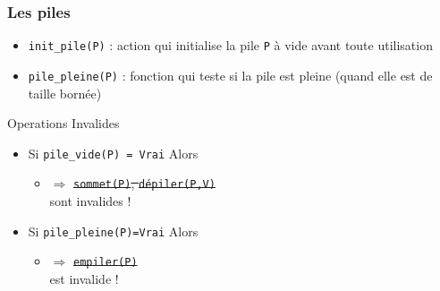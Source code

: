 \documentclass[table,handout,tikz,12pt,svgnames]{beamer}
\begin{document}

\begin{frame}[fragile=singleslide]
	\frametitle{Les piles}
	\begin{block}{}
		\begin{itemize}
			\item \texttt{init\_pile(P)} : action qui initialise la pile \texttt{P} à vide avant toute utilisation
			\item \texttt{pile\_pleine(P)} : fonction qui teste si la pile est pleine (quand elle est de taille bornée)
		\end{itemize}
	\end{block}
	\begin{block}{Operations Invalides}
		\begin{itemize}
			\item Si \hspace{0.2em} \texttt{pile\_vide(P) = Vrai} \hspace{0.2em} Alors
			\begin{itemize}
				\item[] \texttt{$\Rightarrow$} \sout{\texttt{sommet(P)}, \texttt{dépiler(P,V)}} \\sont invalides !
			\end{itemize}
			\item Si \hspace{0.2em} \texttt{pile\_pleine(P)=Vrai} \hspace{0.2em} Alors
			\begin{itemize}
				\item[] \texttt{$\Rightarrow$} \sout{\texttt{empiler(P)}} \\
				est invalide !
			\end{itemize}
			
		\end{itemize}
	\end{block}	
\end{frame}
\end{document}
